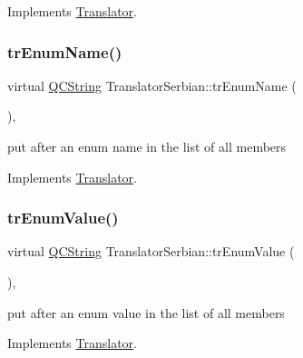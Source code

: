 Implements \mbox{\hyperlink{class_translator}{Translator}}.

\mbox{\label{class_translator_serbian_a1a2920bf737a78326f8ca713f2a8174e}} 
\subsubsection{\texorpdfstring{trEnumName()}{trEnumName()}}
{\footnotesize\ttfamily virtual \mbox{\hyperlink{class_q_c_string}{Q\+C\+String}} Translator\+Serbian\+::tr\+Enum\+Name (\begin{DoxyParamCaption}{ }\end{DoxyParamCaption})\hspace{0.3cm}{\ttfamily [inline]}, {\ttfamily [virtual]}}

put after an enum name in the list of all members 

Implements \mbox{\hyperlink{class_translator}{Translator}}.

\mbox{\label{class_translator_serbian_aa36f223b3591d613aab1a969eea9fd0f}} 
\subsubsection{\texorpdfstring{trEnumValue()}{trEnumValue()}}
{\footnotesize\ttfamily virtual \mbox{\hyperlink{class_q_c_string}{Q\+C\+String}} Translator\+Serbian\+::tr\+Enum\+Value (\begin{DoxyParamCaption}{ }\end{DoxyParamCaption})\hspace{0.3cm}{\ttfamily [inline]}, {\ttfamily [virtual]}}

put after an enum value in the list of all members 

Implements \mbox{\hyperlink{class_translator}{Translator}}.

\mbox{\label{class_translator_serbian_a7eea1f3c614c88d56828a3449195da2a}} 
